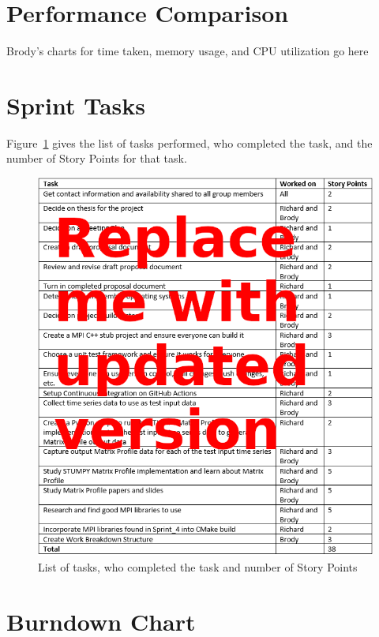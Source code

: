 \documentclass[conference]{IEEEtran}
\begin{document}
\section{Performance Comparison}

Brody's charts for time taken, memory usage, and CPU utilization go here

\section{Sprint Tasks}

Figure~\ref{fig:SprintTasks} gives the list of tasks performed, who completed the task, and the number of Story Points for that task.

\begin{figure}
\begin{center}
\includegraphics[scale=1.05]{tasks.png}
\caption{List of tasks, who completed the task and number of Story Points}
\label{fig:SprintTasks}
\end{center}
\end{figure}


\section{Burndown Chart}
\end{document}
